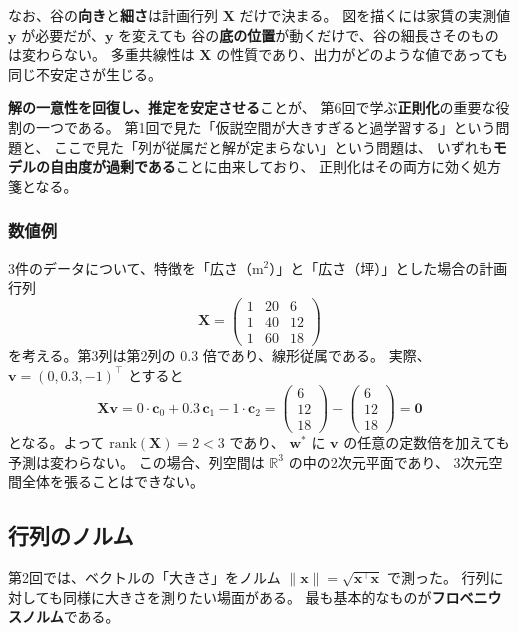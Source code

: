 なお、谷の\textbf{向き}と\textbf{細さ}は計画行列 $\bm{X}$ だけで決まる。
図を描くには家賃の実測値 $\bm{y}$ が必要だが、$\bm{y}$ を変えても
谷の\textbf{底の位置}が動くだけで、谷の細長さそのものは変わらない。
多重共線性は $\bm{X}$ の性質であり、出力がどのような値であっても同じ不安定さが生じる。

\textbf{解の一意性を回復し、推定を安定させる}ことが、
第6回で学ぶ\textbf{正則化}の重要な役割の一つである。
第1回で見た「仮説空間が大きすぎると過学習する」という問題と、
ここで見た「列が従属だと解が定まらない」という問題は、
いずれも\textbf{モデルの自由度が過剰である}ことに由来しており、
正則化はその両方に効く処方箋となる。

\subsubsection{数値例}

3件のデータについて、特徴を「広さ（$\mathrm{m}^2$）」と「広さ（坪）」とした場合の計画行列
\begin{equation*}
  \bm{X} = \begin{pmatrix} 1 & 20 & 6 \\ 1 & 40 & 12 \\ 1 & 60 & 18 \end{pmatrix}
\end{equation*}
を考える。第3列は第2列の $0.3$ 倍であり、線形従属である。
実際、$\bm{v} = (0, 0.3, -1)^\top$ とすると
\begin{equation*}
  \bm{X}\bm{v} = 0 \cdot \bm{c}_0 + 0.3\,\bm{c}_1 - 1 \cdot \bm{c}_2
  = \begin{pmatrix} 6 \\ 12 \\ 18 \end{pmatrix} - \begin{pmatrix} 6 \\ 12 \\ 18 \end{pmatrix}
  = \bm{0}
\end{equation*}
となる。よって $\mathrm{rank}(\bm{X}) = 2 < 3$ であり、
$\bm{w}^*$ に $\bm{v}$ の任意の定数倍を加えても予測は変わらない。
この場合、列空間は $\mathbb{R}^3$ の中の2次元平面であり、
3次元空間全体を張ることはできない。


\subsection{行列のノルム}

第2回では、ベクトルの「大きさ」をノルム $\|\bm{x}\| = \sqrt{\bm{x}^\top \bm{x}}$ で測った。
行列に対しても同様に大きさを測りたい場面がある。
最も基本的なものが\textbf{フロベニウスノルム}である。

